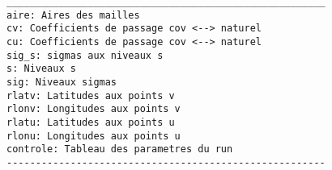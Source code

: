 \begin{verbatim}
_______________________________________________________
aire: Aires des mailles
cv: Coefficients de passage cov <--> naturel
cu: Coefficients de passage cov <--> naturel
sig_s: sigmas aux niveaux s
s: Niveaux s
sig: Niveaux sigmas
rlatv: Latitudes aux points v
rlonv: Longitudes aux points v
rlatu: Latitudes aux points u
rlonu: Longitudes aux points u
controle: Tableau des parametres du run
-------------------------------------------------------
\end{verbatim}
